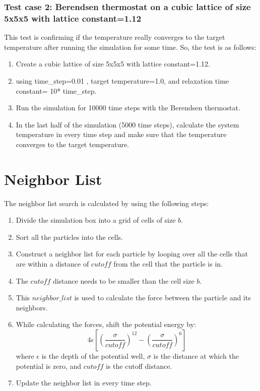     \subsubsection{Test case 2: Berendsen thermostat on a cubic lattice of size 5x5x5 with lattice constant=1.12}
    This test is confirming if the temperature really converges to the target temperature after running the simulation for some time. So, the test is as follows:
    \begin{enumerate}
        \item Create a cubic lattice of size 5x5x5 with lattice constant=1.12.
        \item using time\_step=0.01 , target temperature=1.0, and relaxation time constant= 10* time\_step.
        \item Run the simulation for 10000 time steps with the Berendsen thermostat.
        \item In the last half of the simulation (5000 time steps), calculate the system temperature in every time step and make sure that the temperature converges to the target temperature.
    \end{enumerate}


\section{Neighbor List}
    The neighbor list search is calculated by using the following steps:
        \begin{enumerate}
            \item Divide the simulation box into a grid of cells of size $b$.
            \item Sort all the particles into the cells.
            \item Construct a neighbor list for each particle by looping over all the cells that are within a distance of $cutoff$ from the cell that the particle is in.
            \item The $cutoff$ distance needs to be smaller than the cell size $b$.
            \item This $neighbor\_list$ is used to calculate the force between the particle and its neighbors.
            \item While calculating the forces, shift the potential energy by:
            \begin{equation}
                4 \epsilon [\left(\frac{\sigma}{cutoff}\right)^{12} - \left(\frac{\sigma}{cutoff}\right)^{6}]
            \end{equation}
            where $\epsilon$ is the depth of the potential well, $\sigma$ is the distance at which the potential is zero, and $cutoff$ is the cutoff distance.
            \item Update the neighbor list in every time step.
        \end{enumerate}


